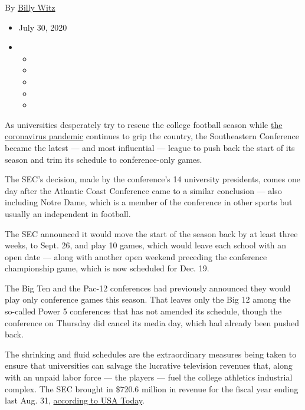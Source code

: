 By \href{https://www.nytimes3xbfgragh.onion/by/billy-witz}{Billy Witz}

\begin{itemize}
\item
  July 30, 2020
\item
  \begin{itemize}
  \item
  \item
  \item
  \item
  \item
  \end{itemize}
\end{itemize}

As universities desperately try to rescue the college football season
while
\href{https://www.nytimes3xbfgragh.onion/news-event/coronavirus}{the
coronavirus pandemic} continues to grip the country, the Southeastern
Conference became the latest --- and most influential --- league to push
back the start of its season and trim its schedule to conference-only
games.

The SEC's decision, made by the conference's 14 university presidents,
comes one day after the Atlantic Coast Conference came to a similar
conclusion --- also including Notre Dame, which is a member of the
conference in other sports but usually an independent in football.

The SEC announced it would move the start of the season back by at least
three weeks, to Sept. 26, and play 10 games, which would leave each
school with an open date --- along with another open weekend preceding
the conference championship game, which is now scheduled for Dec. 19.

The Big Ten and the Pac-12 conferences had previously announced they
would play only conference games this season. That leaves only the Big
12 among the so-called Power 5 conferences that has not amended its
schedule, though the conference on Thursday did cancel its media day,
which had already been pushed back.

The shrinking and fluid schedules are the extraordinary measures being
taken to ensure that universities can salvage the lucrative television
revenues that, along with an unpaid labor force --- the players --- fuel
the college athletics industrial complex. The SEC brought in \$720.6
million in revenue for the fiscal year ending last Aug. 31,
\href{https://www.usatoday.com/story/sports/ncaaf/sec/2020/01/30/sec-generated-721-million-revenue-still-trails-big-ten/2856234001/}{according
to USA Today}.

